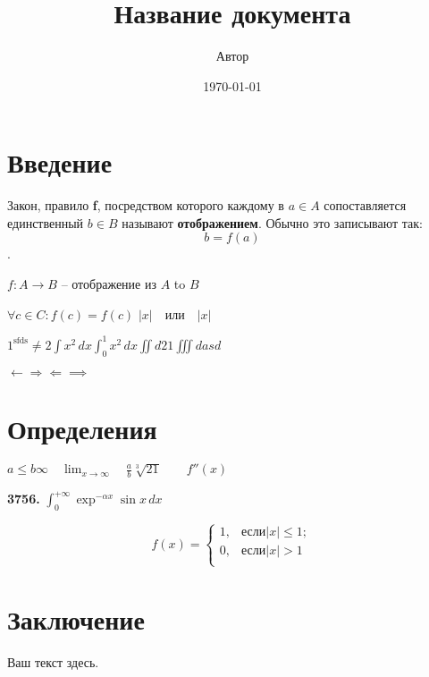 \documentclass[a4paper,12pt]{article}
\title{Название документа}
\author{Автор}
\date{\today}
\begin{document}
\maketitle

\section{Введение}
Закон, правило \textbf{f}, посредством которого каждому в
$a \in A$ сопоставляется единственный $b \in B$ называют \textbf{отображением}. Обычно
это записывают так: \[ b = f(a) \].

$f : A \to B$ -- отображение из \( A \) to \(B\)

$\forall c \in C: f(c) = f(c)$
$\vert x \vert \quad \text{или} \quad |x|$

$1^\text{sfds} \neq 2 \int x^2 \, dx \int_{0}^{1} x^2 \, dx \iint d21 \iiint dasd$

$\leftarrow \Rightarrow \Leftarrow \implies $
\section{Определения}

$a \leq b \infty \quad \lim_{x \to \infty} \quad \frac{a}{b} \sqrt[3]{21} \qquad f''(x )$

\textbf{3756.} $\int_{0}^{+\infty} \exp^{-\alpha x}\sin x \, dx$

\[
f(x) = 
\begin{cases}
    1, & \text{если} |x| \leq 1; \\
    0, & \text{если} |x| > 1 \\
    
\end{cases}
\]


\section{Заключение}
Ваш текст здесь.
\end{document}
